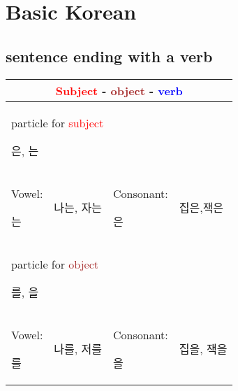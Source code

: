 \section{Basic Korean}

\subsection{sentence ending with a verb}
\begin{tabular}{|p{100pt}p{100pt}|p{100pt}p{100pt}|}
\hline
	\multicolumn{4}{|c|}{\textcolor{red}{Subject} - \textcolor{brown}{object} - \textcolor{blue}{verb}}\\
\hline
	\multicolumn{4}{|l|}{particle for \textcolor{red}{subject}  	\begin{Korean} 은, 는\end{Korean}}\\
	
	Vowel:\begin{Korean} 는\end{Korean} & \begin{Korean} 나는, 자는 \end{Korean} &	
	Consonant:\begin{Korean}은\end{Korean} & \begin{Korean} 집은,잭은 \end{Korean}\\

\hline
		
	\multicolumn{4}{|l|}{particle for \textcolor{brown}{object} 	\begin{Korean} 를, 을\end{Korean}}\\
	
	Vowel:\begin{Korean} 를\end{Korean} &  	\begin{Korean} 나를, 저를 \end{Korean}  & Consonant:\begin{Korean}을\end{Korean} & \begin{Korean} 집을, 잭을 \end{Korean}\\
\hline

\end{tabular}
